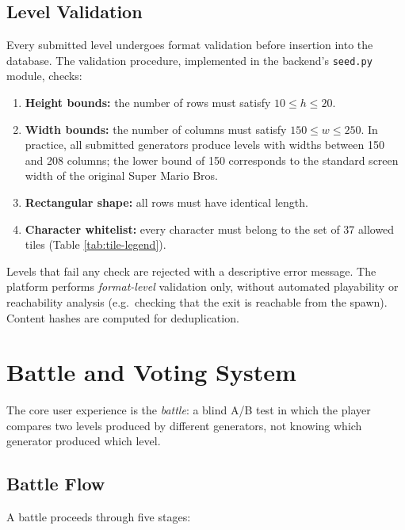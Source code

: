 \documentclass[shortabstract, mgr, english]{iithesis}
\begin{document}
\subsection{Level Validation}
\label{subsec:sd-level-validation}

Every submitted level undergoes format validation before insertion into the database. The
validation procedure, implemented in the backend's \texttt{seed.py} module, checks:

\begin{enumerate}
    \item \textbf{Height bounds:} the number of rows must satisfy
          $10 \leq h \leq 20$.
    \item \textbf{Width bounds:} the number of columns must satisfy
          $150 \leq w \leq 250$.  In practice, all submitted generators produce levels
          with widths between 150 and 208 columns; the lower bound of 150
          corresponds to the standard screen width of the original Super Mario Bros.
    \item \textbf{Rectangular shape:} all rows must have identical length.
    \item \textbf{Character whitelist:} every character must belong to the set of
          37 allowed tiles (Table \ref{tab:tile-legend}).
\end{enumerate}

Levels that fail any check are rejected with a descriptive error message. The
platform performs \emph{format-level} validation only, without automated playability
or reachability analysis (e.g.\ checking that the exit is reachable from the spawn).
Content hashes are computed for deduplication.

\section{Battle and Voting System}
\label{sec:sd-battle}

The core user experience is the \emph{battle}: a blind A/B test in which the player
compares two levels produced by different generators, not knowing which generator
produced which level.

\subsection{Battle Flow}
\label{subsec:sd-battle-flow}

A battle proceeds through five stages:
\end{document}
